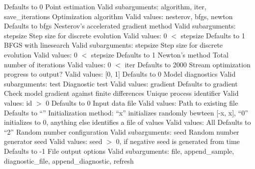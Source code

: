 \begin{description}
          {Defaults to 0}
%
    {Point estimation}
    {Valid subarguments: algorithm, iter, save\_iterations}
%
      {Optimization algorithm}
      {Valid values: nesterov, bfgs, newton}
      {Defaults to bfgs}
%
        {Nesterov's accelerated gradient method}
        {Valid subarguments: stepsize}
%
          {Step size for discrete evolution}
          {Valid values: 0 $<$ stepsize}
          {Defaults to 1}
%
        {BFGS with linesearch}
        {Valid subarguments: stepsize}
%
          {Step size for discrete evolution}
          {Valid values: 0 $<$ stepsize}
          {Defaults to 1}
%
        {Newton's method}
%
      {Total number of iterations}
      {Valid values: 0 $<$ iter}
      {Defaults to 2000}
%
      {Stream optimization progress to output?}
      {Valid values: [0, 1]}
      {Defaults to 0}
%
    {Model diagnostics}
    {Valid subarguments: test}
%
      {Diagnostic test}
      {Valid values: gradient}
      {Defaults to gradient}
%
        {Check model gradient against finite differences}
%
  {Unique process identifier}
  {Valid values: id $>$ 0}
  {Defaults to 0}
%
  {Input data file}
  {Valid values: Path to existing file}
  {Defaults to ``''}
%
  {Initialization method: ``x'' initializes randomly bewteen [-x, x], ``0'' initializes to 0, anything else identifies a file of values}
  {Valid values: All}
  {Defaults to ``2''}
%
  {Random number configuration}
  {Valid subarguments: seed}
%
    {Random number generator seed}
    {Valid values: seed $>$ 0, if negative seed is generated from time}
    {Defaults to -1}
%
  {File output options}
  {Valid subarguments: file, append\_sample, diagnostic\_file, append\_diagnostic, refresh}

\end{description}
